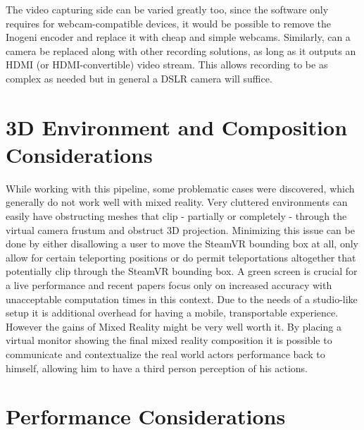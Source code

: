 The video capturing side can be varied greatly too, since the software only 
requires for webcam-compatible devices, it would be possible to remove 
the Inogeni encoder and replace it with cheap and simple webcams. Similarly, 
can a camera be replaced along with other recording solutions, as long as it 
outputs an HDMI (or HDMI-convertible) video stream. This allows recording to be 
as complex as needed but in general a DSLR camera will suffice.

\section{3D Environment and Composition Considerations}

While working with this pipeline, some problematic cases were discovered, which 
generally do not work well with mixed reality. Very cluttered environments can 
easily have obstructing meshes that clip - partially or completely - through 
the virtual camera frustum and obstruct 3D projection. Minimizing this issue 
can be done by either disallowing a user to move the SteamVR bounding box at 
all, only allow for certain teleporting positions or do permit teleportations 
altogether that potentially clip through the SteamVR bounding box.
\newline
A green screen is crucial for a live performance and recent papers focus only 
on increased accuracy with unacceptable computation times in this context. Due 
to the needs of a studio-like setup it is additional overhead for having a 
mobile, transportable experience. However the gains of Mixed Reality might be 
very well worth it. 
\newline
By placing a virtual monitor showing the final mixed reality composition it is 
possible to communicate and contextualize the real world actors performance 
back to himself, allowing him to have a third person perception of his actions.

\section{Performance Considerations}

